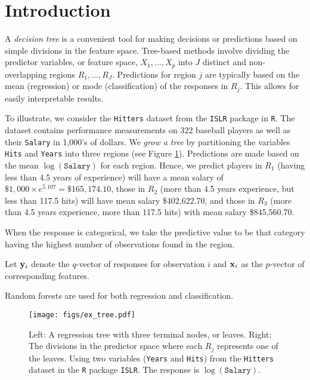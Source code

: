 \section{Introduction} %

A \emph{decision tree} is a convenient tool for making decisions or predictions based on simple divisions in the feature space. Tree-based methods involve dividing the predictor variables, or feature space, $X_1,\ldots,X_p$ into $J$ distinct and non-overlapping regions $R_1,\ldots,R_J$. Predictions for region $j$ are typically based on the mean (regression) or mode (classification) of the responses in $R_j$. This allows for easily interpretable results.

To illustrate, we consider the \texttt{Hitters} dataset from the \texttt{ISLR} package in \texttt{R}. The dataset contains performance measurements on $322$ baseball players as well as their \texttt{Salary} in 1,000's of dollars. We \emph{grow a tree} by partitioning the variables \texttt{Hits} and \texttt{Years} into three regions (see Figure \ref{tree1}). Predictions are made based on the mean $\log(\mathtt{Salary})$ for each region. Hence, we predict players in $R_1$ (having less than 4.5 years of experience) will have a mean salary of $\$1,000\times e^{5.107}=\$165,174.10$, those in $R_2$ (more than 4.5 years experience, but less than 117.5 hits) will have mean salary \$402,622.70, and those in $R_3$ (more than 4.5 years experience, more than 117.5 hits) with mean salary \$845,560.70.

When the response is categorical, we take the predictive value to be that category having the highest number of observations found in the region.


Let $\mathbf{\bm{y}}_i$ denote the $q$-vector of responses for observation $i$ and $\mathbf{\bm{x}}_i$ as the $p$-vector of corresponding features.

Random forests are used for both regression and classification.


\begin{figure}
\begin{center}
\texttt{[image: figs/ex\_tree.pdf]}
\caption{Left: A regression tree with three terminal nodes, or leaves. Right: The divisions in the predictor space where each $R_j$ represents one of the leaves. Using two variables (\texttt{Years} and \texttt{Hits}) from the \texttt{Hitters} dataset in the \texttt{R} package \texttt{ISLR}. The response is $\log(\mathtt{Salary})$.}
\label{tree1}
\end{center}
\end{figure}
